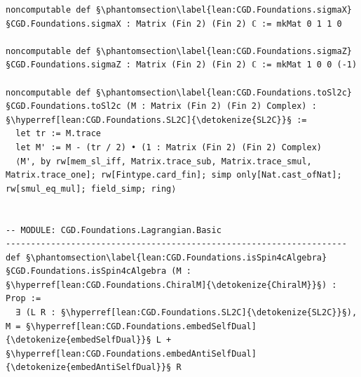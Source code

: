\begin{verbatim}
noncomputable def §\phantomsection\label{lean:CGD.Foundations.sigmaX}§CGD.Foundations.sigmaX : Matrix (Fin 2) (Fin 2) ℂ := mkMat 0 1 1 0

noncomputable def §\phantomsection\label{lean:CGD.Foundations.sigmaZ}§CGD.Foundations.sigmaZ : Matrix (Fin 2) (Fin 2) ℂ := mkMat 1 0 0 (-1)

noncomputable def §\phantomsection\label{lean:CGD.Foundations.toSl2c}§CGD.Foundations.toSl2c (M : Matrix (Fin 2) (Fin 2) Complex) : §\hyperref[lean:CGD.Foundations.SL2C]{\detokenize{SL2C}}§ :=
  let tr := M.trace
  let M' := M - (tr / 2) • (1 : Matrix (Fin 2) (Fin 2) Complex)
  ⟨M', by rw[mem_sl_iff, Matrix.trace_sub, Matrix.trace_smul, Matrix.trace_one]; rw[Fintype.card_fin]; simp only[Nat.cast_ofNat]; rw[smul_eq_mul]; field_simp; ring⟩


-- MODULE: CGD.Foundations.Lagrangian.Basic
--------------------------------------------------------------------
def §\phantomsection\label{lean:CGD.Foundations.isSpin4cAlgebra}§CGD.Foundations.isSpin4cAlgebra (M : §\hyperref[lean:CGD.Foundations.ChiralM]{\detokenize{ChiralM}}§) : Prop :=
  ∃ (L R : §\hyperref[lean:CGD.Foundations.SL2C]{\detokenize{SL2C}}§), M = §\hyperref[lean:CGD.Foundations.embedSelfDual]{\detokenize{embedSelfDual}}§ L + §\hyperref[lean:CGD.Foundations.embedAntiSelfDual]{\detokenize{embedAntiSelfDual}}§ R



\end{verbatim}
